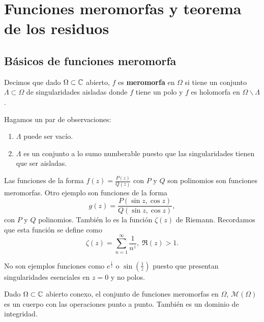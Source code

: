 \chapter{Funciones meromorfas y teorema de los residuos}
\section{Básicos de funciones meromorfa}
\begin{definition}
Decimos que dado $\displaystyle \Omega \subset \mathbb{C} $ abierto, $\displaystyle f $ es \textbf{meromorfa} en $\displaystyle \Omega  $ si tiene un conjunto $\displaystyle \Lambda \subset \Omega  $ de singularidades aisladas donde $\displaystyle f $ tiene un polo y $\displaystyle f $ es holomorfa en $\displaystyle \Omega \backslash \Lambda  $.
\end{definition}
\begin{observation}
Hagamos un par de observaciones:
\begin{enumerate}
\item $\displaystyle \Lambda  $ puede ser vacío.
\item $\displaystyle \Lambda $ es un conjunto a lo sumo numberable puesto que las singularidades tienen que ser aisladas.
\end{enumerate}
\end{observation}
\begin{eg}
Las funciones de la forma $\displaystyle f\left(z\right)=\frac{P\left(z\right)}{Q\left(z\right)} $ con $\displaystyle P $ y $\displaystyle Q $ son polinomios son funciones meromorfas. Otro ejemplo son funciones de la forma 
\[g\left(z\right)=\frac{P\left(\sin z, \cos z\right)}{Q\left(\sin z, \cos z\right)} ,\]
con $\displaystyle P $ y $\displaystyle Q $ polinomios. También lo es la función $\displaystyle \zeta\left(z\right) $ de Riemann. Recordamos que esta función se define como
\[\zeta\left(z\right)=\sum^{\infty}_{n = 1}\frac{1}{n^{z}}, \; \Re\left(z\right) > 1 .\]
\end{eg}
\begin{eg}
No son ejemplos funciones como $\displaystyle e^{\frac{1}{z}} $ o $\displaystyle \sin\left(\frac{1}{z}\right) $ puesto que presentan singularidades esenciales en $\displaystyle z = 0 $ y no polos.
\end{eg}
\begin{observation}
Dado $\displaystyle \Omega\subset \mathbb{C} $ abierto conexo, el conjunto de funciones meromorfas en $\displaystyle \Omega  $, $\displaystyle \mathcal{M}\left(\Omega \right) $ es un cuerpo con las operaciones punto a punto. También es un dominio de integridad.
\end{observation}
